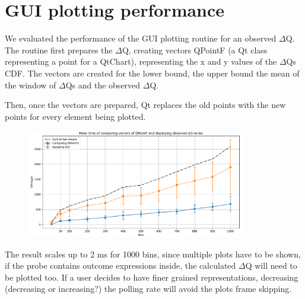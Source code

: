 \section{GUI plotting performance}
    We evaluated the performance of the GUI plotting routine for an observed $\Delta$Q. The routine first prepares the $\Delta$Q, creating vectors QPointF (a Qt class representing a point for a QtChart), representing the x and y values of the $\Delta$Qs CDF. The vectors are created for the lower bound, the upper bound the mean of the window of $\Delta$Qs and the observed $\Delta$Q.

    Then, once the vectors are prepared, Qt replaces the old points with the new points for every element being plotted.

    \begin{figure}[H]
        \begin{center}
            \includegraphics[width = 0.85\textwidth]{img/plots.pdf}
        \end{center}
    \end{figure}

    The result scales up to 2 ms for 1000 bins, since multiple plots have to be shown, if the probe contains outcome expressions inside, the calculated $\Delta$Q will need to be plotted too. If a user decides to have finer grained representations, decreasing (decreasing or increasing?) the polling rate will avoid the plots frame skipping.
